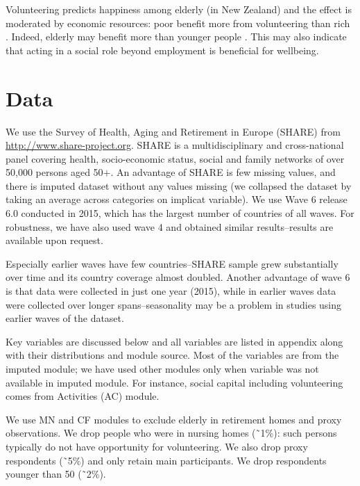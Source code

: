 \documentclass[10pt, letterpaper]{article}
\begin{document}
\begin{spacing}{1.4}
Volunteering  predicts happiness among elderly (in
New Zealand) and the effect is moderated by
economic resources: poor benefit more from volunteering than rich
\citep{dulin2012volunteering}. Indeed,  elderly may benefit more than  younger people
\citep{van2000differential,wahrendorf06}. This may also indicate that acting in
a social role beyond employment is beneficial for wellbeing.


\section*{Data} 

We use the Survey of Health, Aging and Retirement in Europe (SHARE) from
\url{http://www.share-project.org}.
 SHARE is a multidisciplinary and
cross-national panel covering health, socio-economic status,
social and family networks of over 50,000 persons aged 50$+$. 
%
An advantage of SHARE is few missing values, 
 and there is imputed dataset without any values missing (we collapsed the
 dataset by taking an average across categories on implicat variable). %
%
We use  %
 Wave 6 release 6.0
 conducted  in 2015, which has the largest number of
countries of all waves. 
%
For robustness, we have also used wave 4 and obtained similar results--results
are available upon request.  



                                
Especially earlier waves have few countries--SHARE sample grew substantially
over time and its country coverage almost doubled. Another advantage of wave 6 is that
data were collected in just one year (2015), %
while in earlier waves data were collected over longer spans--seasonality may be
a problem in studies using earlier waves of the dataset.

Key variables are discussed below and all variables are listed in appendix along
with their distributions and module source.
Most of the variables are from the imputed module; we have used other modules
only when variable was not available in imputed module. For instance, social capital including
volunteering comes from Activities (AC) module. 

 We use MN and CF modules to
exclude elderly in retirement homes and proxy observations.
%
We drop people who were in nursing homes (\~\ 1\%): such persons typically do
not have opportunity for volunteering. We also drop proxy respondents (\~\ 5\%) and only retain
main participants. %
 We drop respondents younger than 50 (\~\ 2\%). %


\end{spacing}
\end{document}
